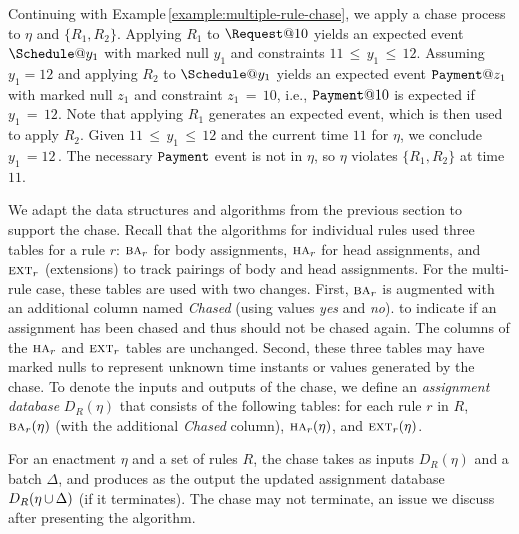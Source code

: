 \begin{examp}
  Continuing with Example\,\ref{example:multiple-rule-chase},
  we apply a chase process to $\eta$ and $\{R_1,R_2\}$.
  Applying $R_1$ to $\Request@10$
  yields an expected event 
  $\Schedule@y_1$ with marked null $y_1$
  and constraints
  $11 \,{\leq}\, y_1 \,{\leq}\, 12$.
  Assuming $y_1=12$ and applying $R_2$ to $\Schedule@y_1$ 
  yields an expected event 
  $\Payment@z_1$ with marked null $z_1$
  and constraint $z_1\,{=}\,10$,
  i.e.,
  $\Payment@10$ is expected if $y_1\,{=}\,12$.
  Note that applying $R_1$ generates
  an expected event, which is then used to apply $R_2$.
  Given $11 \,{\leq}\, y_1 \,{\leq}\, 12$ and
  the current time $11$ for $\eta$,
  we conclude $y_1\,{=12}\,$.
  The necessary $\texttt{Payment}$ event is not in $\eta$,
  so $\eta$ violates $\{R_1,R_2\}$ at time $11$.
\end{examp}

We adapt the data structures and algorithms
from the previous section to support the chase.
Recall that the algorithms for individual rules
used three tables for a rule $r$:
$\BODY/_r$ for body assignments,
$\HEAD/_r$ for head assignments, and
$\textsc{ext}_r$ (extensions)
to track pairings of body and head assignments.
For the multi-rule case,
these tables are used with two changes.
First,
$\BODY/_r$ is augmented
with an additional column named {\em Chased}
(using values {\em yes} and {\em no}).
to indicate if an assignment has been chased
and thus should not be chased again.
The columns of the $\HEAD/_r$ and $\textsc{ext}_r$ tables are unchanged.
Second,
these three tables may have marked nulls
to represent unknown time instants or values
generated by the chase.
To denote the inputs and outputs of the chase,
we define an {\it assignment database} $D_{R}(\eta)$
that consists of the following tables:
for each rule $r$ in $R$,
$\BODY/_r(\eta)$ (with the additional {\it Chased} column),
$\HEAD/_r(\eta)$,
and
$\textsc{ext}_r(\eta)$.

For an enactment $\eta$ and a set of rules $R$,
the chase takes as inputs
$D_{R}(\eta)$ and a batch $\Delta$,
and produces as the output the updated assignment database
$D_{R}(\eta\,{\cup}\,\Delta)$
(if it terminates).
The chase may not terminate,
an issue we discuss after presenting the algorithm.


